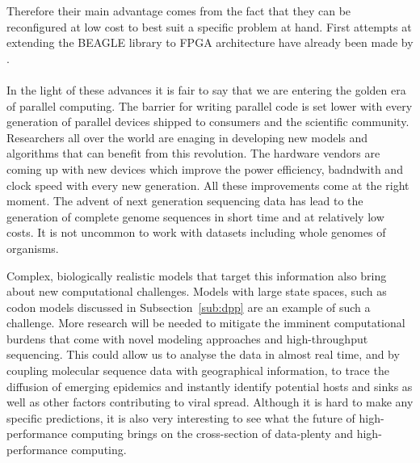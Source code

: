 Therefore their main advantage comes from the fact that they can be reconfigured at low  cost to best suit a specific problem at hand.
First attempts at extending the BEAGLE library to FPGA architecture have already been made by \cite{Jin2013}.

\paragraph{}
In the light of these advances it is fair to say that we are entering the golden era of parallel computing.
The barrier for writing parallel code is set lower with every generation of parallel devices shipped to consumers and the scientific community.
Researchers all over the world are enaging in developing new models and algorithms that can benefit from this revolution.
The hardware vendors are coming up with new devices which improve the power efficiency, badndwith and clock speed with every new generation.
All these improvements come at the right moment.
The advent of next generation sequencing data has lead to the generation of complete genome sequences in short time and at relatively low costs.
It is not uncommon to work with datasets including whole genomes of organisms.

Complex, biologically realistic models that target this information also bring about new computational challenges.
Models with large state spaces, such as codon models discussed in Subsection~\ref{sub:dpp} are an example of such a challenge.
More research will be needed to mitigate the imminent computational burdens that come with novel modeling approaches and high-throughput sequencing. 
This could allow us to analyse the data in almost real time, and by coupling molecular sequence data with geographical information, to trace the diffusion of emerging epidemics and instantly identify potential hosts and sinks as well as  other factors contributing to viral spread.  
Although it is hard to make any specific predictions, it is also very interesting to see what the future of high-performance computing brings on the cross-section of data-plenty and high-performance computing.

















